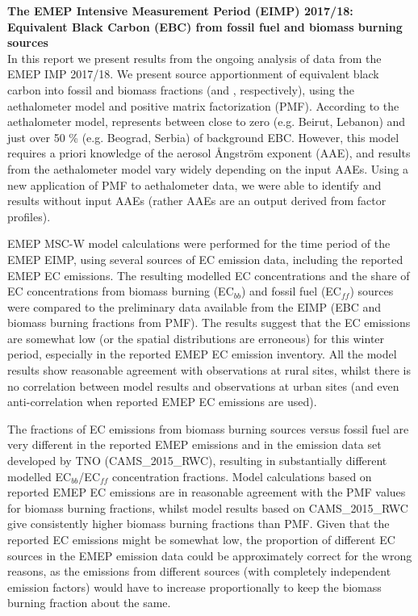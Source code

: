 \noindent
\textbf{The EMEP Intensive Measurement Period (EIMP) 2017/18: Equivalent Black Carbon (EBC) from fossil fuel and biomass burning sources}\\
In this report we present results from the ongoing analysis of data from the EMEP IMP 2017/18. We present source apportionment of equivalent black carbon into fossil and biomass fractions (\EBCff and \EBCbb, respectively), using the aethalometer model and positive matrix factorization (PMF). According to the aethalometer model, \EBCbb represents between close to zero (e.g. Beirut, Lebanon) and just over 50 \% (e.g. Beograd, Serbia) of background EBC. However, this model requires a priori knowledge of the aerosol {\AA}ngstr{\"o}m exponent (AAE), and results from the aethalometer model vary widely depending on the input AAEs. Using a new application of PMF to aethalometer data, we were able to identify \EBCff and \EBCbb  results without input AAEs (rather AAEs are an output derived from factor profiles).

EMEP MSC-W model calculations were performed for the time period of the EMEP EIMP, using several sources of EC emission data, including the reported EMEP EC emissions.
The resulting modelled EC concentrations and the share of EC concentrations  from biomass burning (EC$_{bb}$) and fossil fuel (EC$_{ff}$) sources were compared to the preliminary data available from the EIMP (EBC and biomass burning fractions from PMF). The results suggest that the EC emissions are somewhat low (or the spatial distributions are erroneous) for this winter period, especially in the reported EMEP EC emission inventory.  All the model results show reasonable agreement with observations at rural sites, whilst there is no correlation between model results and observations at urban sites (and even anti-correlation when reported EMEP EC emissions are used). 

The fractions of EC emissions from biomass burning sources versus fossil fuel are very different in the reported EMEP emissions and in the emission data set developed by TNO (CAMS\_2015\_RWC), resulting in substantially different modelled EC$_{bb}$/EC$_{ff}$ concentration fractions. Model calculations based on reported EMEP EC emissions are in reasonable agreement with the PMF values for biomass burning fractions, whilst model results based on CAMS\_2015\_RWC give consistently higher biomass burning fractions than PMF. Given that the reported EC emissions might be somewhat low, the proportion of different EC sources in the EMEP emission data could be approximately correct for the wrong reasons, as the emissions from different sources (with completely independent emission factors) would have to increase proportionally to keep the biomass burning fraction about the same.

